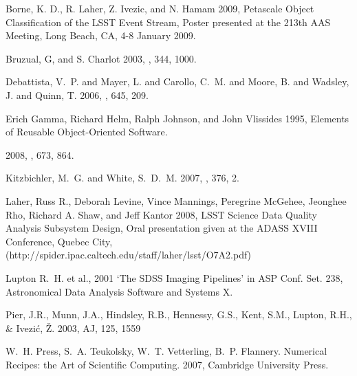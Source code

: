 \begin{thebibliography}{}

 Borne, K. D., R. Laher, Z. Ivezic, and N. Hamam 2009,
   Petascale Object Classification of the LSST Event Stream, 
   Poster presented at the 213th AAS Meeting, Long Beach, CA, 4-8
   January 2009.

 Bruzual, G, and
  S. Charlot 2003, \mnras, 344, 1000.

  {{Debattista}, V.~P. and {Mayer}, L. and {Carollo}, C.~M. and  
    {Moore}, B. and {Wadsley}, J. and {Quinn}, T.} 2006, \apj, 645, 209.

Erich Gamma, Richard Helm, Ralph Johnson, and John Vlissides 1995,
Elements of Reusable Object-Oriented Software.

 2008,
  \apj, 673, 864.

  {{Kitzbichler}, M.~G. and {White}, S.~D.~M.} 2007, \mnras, 376, 2.

 Laher, Russ R., Deborah Levine, Vince Mannings, 
   Peregrine McGehee, Jeonghee Rho, Richard A. Shaw, and Jeff Kantor 2008,
   LSST Science Data Quality Analysis Subsystem Design,
   Oral presentation given at the ADASS XVIII Conference, Quebec City, 
   (http://spider.ipac.caltech.edu/staff/laher/lsst/O7A2.pdf)

Lupton R.~H. et al., 2001 `The SDSS Imaging Pipelines' in
ASP Conf. Set. 238, Astronomical Data Analysis Software and Systems X.
   
 Pier, J.R., Munn, J.A., Hindsley, R.B., Hennessy, G.S.,
Kent, S.M., Lupton, R.H., \& Ivezi\'c, \v{Z}. 2003, AJ, 125, 1559

  W.~H. Press,  S.~A. Teukolsky, W.~T. Vetterling, B.~P. Flannery.
  Numerical Recipes: the Art of Scientific Computing.
  2007, Cambridge University Press.
   
\end{thebibliography}
